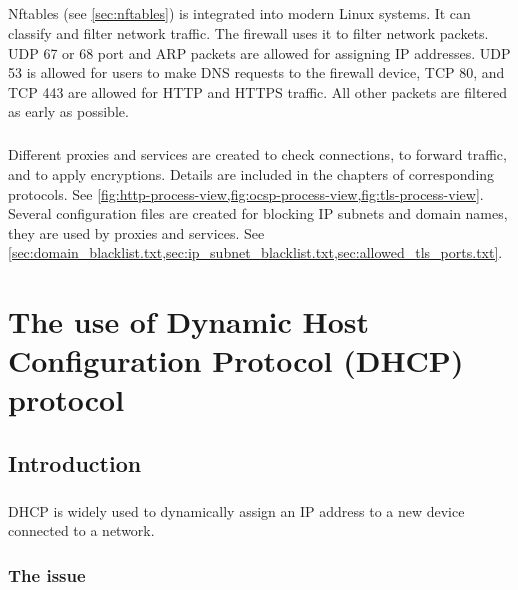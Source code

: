 \documentclass[mscthesis]{usiinfthesis}
\begin{document}
\paragraph{}
Nftables (see \cref{sec:nftables}) is integrated into modern Linux systems. It can classify and filter network traffic. The firewall uses it to filter network packets. UDP 67 or 68 port and ARP packets are allowed for assigning IP addresses. UDP 53 is allowed for users to make DNS requests to the firewall device, TCP 80, and TCP 443 are allowed for HTTP and HTTPS traffic. All other packets are filtered as early as possible.
\paragraph{}
Different proxies and services are created to check connections, to forward traffic, and to apply encryptions. Details are included in the chapters of corresponding protocols. See \cref{fig:http-process-view,fig:ocsp-process-view,fig:tls-process-view}. Several configuration files are created for blocking IP subnets and domain names, they are used by proxies and services. See \cref{sec:domain_blacklist.txt,sec:ip_subnet_blacklist.txt,sec:allowed_tls_ports.txt}.

\chapter{The use of Dynamic Host Configuration Protocol (DHCP) protocol}\label{cha:dhcp}

\section{Introduction}
\paragraph{}
DHCP is widely used to dynamically assign an IP address to a new device connected to a network.

\subsection{The issue}
\end{document}
